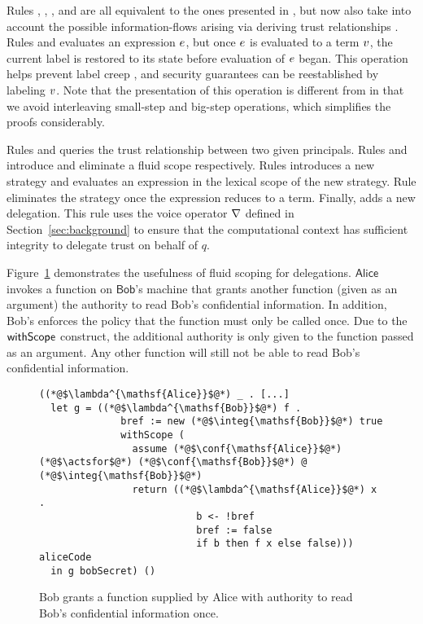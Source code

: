 Rules , , ,  and  are all equivalent to the ones presented in \cite{SRMMlio}, but now also take into account the possible information-flows arising via deriving trust relationships \cite{Arden:2015:FA:2859845.2859998}. Rules  and  evaluates an expression $e$, but once $e$ is evaluated to a term $v$, the current label is restored to its state before evaluation of $e$ began. This operation helps prevent label creep \cite{SRMMlio}, and security guarantees can be reestablished by labeling $v$. Note that the presentation of this operation is different from \cite{SRMMlio} in that we avoid interleaving small-step and big-step operations, which simplifies the proofs considerably.

Rules  and  queries the trust relationship between two given principals. Rules  and  introduce and eliminate a fluid scope respectively. Rules  introduces a new strategy and evaluates an expression in the lexical scope of the new strategy. Rule  eliminates the strategy once the expression reduces to a term. Finally,  adds a new delegation. This rule uses the voice operator $\nabla$ defined in Section~\ref{sec:background} to ensure that the computational context has sufficient integrity to delegate trust on behalf of $q$.

Figure~\ref{fig:use-case-for-fluid-scope} demonstrates the usefulness of fluid scoping for delegations. $\mathsf{Alice}$ invokes a function on $\mathsf{Bob}$'s machine that grants another function (given as an argument) the authority to read Bob's confidential information. In addition, Bob's enforces the policy that the function must only be called once. Due to the $\mathsf{withScope}$ construct, the additional authority is only given to the function passed as an argument. Any other function will still not be able to read Bob's confidential information.

\begin{figure}
\centering
\begin{lstlisting}
((*@$\lambda^{\mathsf{Alice}}$@*) _ . [...]
  let g = ((*@$\lambda^{\mathsf{Bob}}$@*) f .
              bref := new (*@$\integ{\mathsf{Bob}}$@*) true
              withScope (
                assume (*@$\conf{\mathsf{Alice}}$@*) (*@$\actsfor$@*) (*@$\conf{\mathsf{Bob}}$@*) @ (*@$\integ{\mathsf{Bob}}$@*)
                return ((*@$\lambda^{\mathsf{Alice}}$@*) x . 
                           b <- !bref
                           bref := false
                           if b then f x else false))) aliceCode
  in g bobSecret) ()
\end{lstlisting}
\caption{Bob grants a function supplied by Alice with authority to read Bob's confidential information once. }
\label{fig:use-case-for-fluid-scope}
\end{figure}


